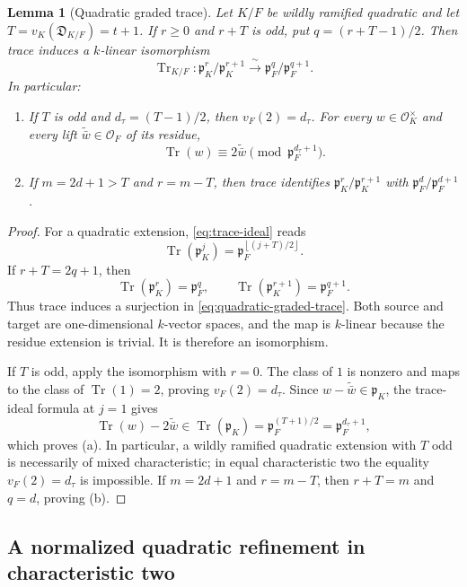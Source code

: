 \documentclass[11pt]{amsart}
\newtheorem{lemma}[theorem]{Lemma}
\theoremstyle{definition}
\theoremstyle{remark}
\newcommand{\cO}{\mathcal O}
\newcommand{\p}{\mathfrak p}
\newcommand{\Tr}{\operatorname{Tr}}
\newcommand{\floor}[1]{\left\lfloor #1\right\rfloor}
\begin{document}
\begin{lemma}[Quadratic graded trace]
\label{lem:quadratic-graded-trace}
Let $K/F$ be wildly ramified quadratic and let
$T=v_K(\mathfrak D_{K/F})=t+1$.  If $r\ge0$ and $r+T$ is odd, put
$q=(r+T-1)/2$.  Then trace induces a $k$-linear isomorphism
\begin{equation}\label{eq:quadratic-graded-trace}
 \Tr_{K/F}:\p_K^r/\p_K^{r+1}
 \xrightarrow{\ \sim\ }
 \p_F^q/\p_F^{q+1}.
\end{equation}
In particular:
\begin{enumerate}[label=(\alph*)]
\item If $T$ is odd and $d_\tau=(T-1)/2$, then
$v_F(2)=d_\tau$.  For every $w\in\cO_K^\times$ and every lift
$\widetilde{\bar w}\in\cO_F$ of its residue,
\begin{equation}\label{eq:quadratic-unit-trace-class}
 \Tr(w)\equiv2\widetilde{\bar w}\pmod{\p_F^{d_\tau+1}}.
\end{equation}
\item If $m=2d+1>T$ and $r=m-T$, then trace identifies
$\p_K^r/\p_K^{r+1}$ with $\p_F^d/\p_F^{d+1}$.
\end{enumerate}
\end{lemma}

\begin{proof}
For a quadratic extension, \eqref{eq:trace-ideal} reads
\[
 \Tr(\p_K^j)=\p_F^{\floor{(j+T)/2}}.
\]
If $r+T=2q+1$, then
\[
 \Tr(\p_K^r)=\p_F^q,
 \qquad
 \Tr(\p_K^{r+1})=\p_F^{q+1}.
\]
Thus trace induces a surjection in
\eqref{eq:quadratic-graded-trace}.  Both source and target are
one-dimensional $k$-vector spaces, and the map is $k$-linear because
the residue extension is trivial.  It is therefore an isomorphism.

If $T$ is odd, apply the isomorphism with $r=0$.  The class of $1$ is
nonzero and maps to the class of $\Tr(1)=2$, proving
$v_F(2)=d_\tau$.  Since $w-\widetilde{\bar w}\in\p_K$, the trace-ideal formula
at $j=1$ gives
\[
 \Tr(w)-2\widetilde{\bar w}\in\Tr(\p_K)
 =\p_F^{(T+1)/2}=\p_F^{d_\tau+1},
\]
which proves (a).  In particular, a wildly ramified quadratic
extension with $T$ odd is necessarily of mixed characteristic; in
equal characteristic two the equality $v_F(2)=d_\tau$ is impossible.
If $m=2d+1$ and $r=m-T$, then $r+T=m$ and $q=d$, proving (b).
\end{proof}

\subsection{A normalized quadratic refinement in characteristic two}
\end{document}
